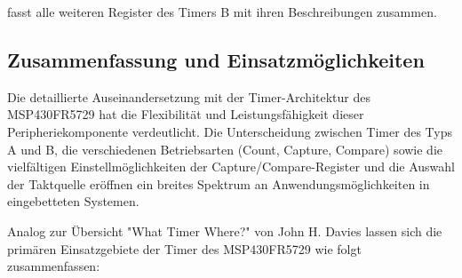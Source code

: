  fasst alle weiteren Register des Timers B mit ihren Beschreibungen zusammen. \AI

\subsection{Zusammenfassung und Einsatzm\"oglichkeiten}
\label{TimerEinsatzmoeglichkeiten}

Die detaillierte Auseinandersetzung mit der Timer-Architektur des MSP430FR5729 hat die Flexibilit\"at und Leistungsf\"ahigkeit dieser Peripheriekomponente verdeutlicht. Die Unterscheidung zwischen Timer des Typs A und B, die verschiedenen Betriebsarten (Count, Capture, Compare) sowie die vielf\"altigen Einstellm\"oglichkeiten der Capture/Compare-Register und die Auswahl der Taktquelle er\"offnen ein breites Spektrum an Anwendungsm\"oglichkeiten in eingebetteten Systemen.

Analog zur \"Ubersicht "What Timer Where?" von John H. Davies lassen sich die prim\"aren Einsatzgebiete der Timer des MSP430FR5729 wie folgt zusammenfassen: 

